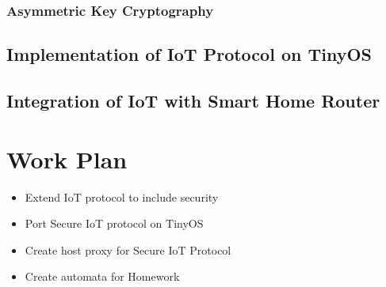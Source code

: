 \documentclass{mprop}
\begin{document}
\subsubsection{Asymmetric Key Cryptography} %
\label{ssub:asymmetric_key_cryptography}


\subsection{Implementation of IoT Protocol on TinyOS} %
\label{sub:implementation_of_iot_protocol_on_tinyos}


\subsection{Integration of IoT with Smart Home Router} %
\label{sub:implementation_of_iot_on_smart_home_router}

\section{Work Plan}

\begin{itemize}
  \item Extend IoT protocol to include security 
  \item Port Secure IoT protocol on TinyOS
  \item Create host proxy for Secure IoT Protocol
  \item Create automata for Homework
\end{itemize}



\end{document}
